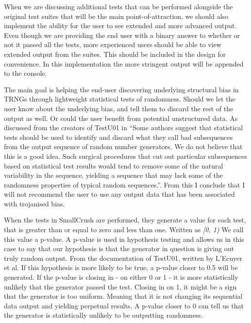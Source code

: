 \documentclass[]{final_report}
\begin{document}
\par{When we are discussing additional tests that can be performed alongside the original test suites that will be the main point-of-attraction, we should also implement the ability for the user to see extended and more advanced output. Even though we are providing the end user with a binary answer to whether or not it passed all the tests, more experienced users should be able to view extended output from the suites. This should be included in the design for convenience. In this implementation the more stringent output will be appended to the console.}

\par{The main goal is helping the end-user discovering underlying structural bias in TRNGs through lightweight statistical tests of randomness. Should we let the user know about the underlying bias, and tell them to discard the rest of the output as well. Or could the user benefit from potential unstructured data. As discussed from the creators of TestU01 in \cite{Ecuyer:2013} ``Some authors suggest that statistical tests should be used to identify and discard what they call bad subsequences from the output sequence of random number generators. We do not believe that this is a good idea. Such surgical procedures that cut out particular subsequences based on statistical test results would tend to remove some of the natural variability in the sequence, yielding a sequence that may lack some of the randomness properties of typical random sequences.''. From this I conclude that I will not recommend the user to use any output data that has been associated with trojanised bias.}

\par{When the tests in SmallCrush are performed, they generate a value for each test, that is greater than or equal to zero and less than one. Written as \textit{[0, 1)} We call this value a p-value. A p-value is used in hypothesis testing and allows us in this case to say that our hypothesis is that the generator in question is giving out truly random output. From the documentation of TestU01, written by L'Ecuyer et al.\cite{Ecuyer:2007} If this hypothesis is more likely to be true, a p-value closer to 0.5 will be generated. If the p-value is closing in - on either 0 or 1 - it is more statistically unlikely that the generator passed the test. Closing in on 1, it might be a sign that the generator is too uniform. Meaning that it is not changing its sequential data output and yielding perpetual results. A p-value closer to 0 can tell us that the generator is statistically unlikely to be outputting randomness.}
\end{document}

